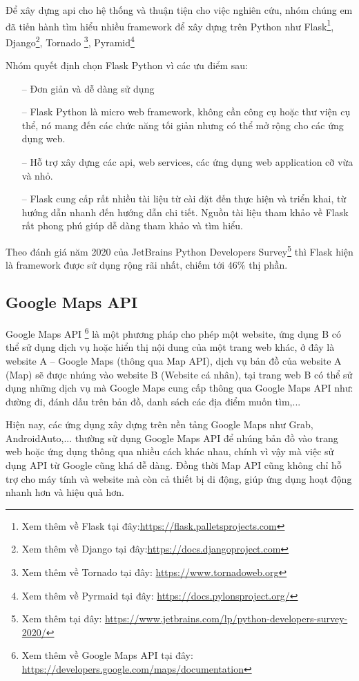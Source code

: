 Để xây dựng \ac{api} cho hệ thống và thuận tiện cho việc nghiên cứu, nhóm chúng em đã tiến hành tìm hiểu nhiều framework để xây dựng trên Python như Flask\footnote{Xem thêm về Flask tại đây:\url{https://flask.palletsprojects.com}}, Django\footnote{Xem thêm về Django tại đây:\url{https://docs.djangoproject.com}}, Tornado \footnote{Xem thêm về Tornado tại đây: \url{https://www.tornadoweb.org}}, Pyramid\footnote{Xem thêm về Pyrmaid tại đây: \url{https://docs.pylonsproject.org/}}

Nhóm quyết định chọn Flask Python vì các ưu điểm sau:
\begin{itemize}
    \item[--] Đơn giản và dễ dàng sử dụng
    \item[--] Flask Python là micro web framework, không cần công cụ hoặc thư viện cụ thể, nó mang đến các chức năng tối giản nhưng có thể mở rộng cho các ứng dụng web.
    \item[--] Hỗ trợ xây dựng các \ac{api}, web services, các ứng dụng web application cỡ vừa và nhỏ.
    \item[--] Flask cung cấp rất nhiều tài liệu từ cài đặt đến thực hiện và triển khai, từ hướng dẫn nhanh đến hướng dẫn chi tiết. Nguồn tài liệu tham khảo về Flask rất phong phú giúp dễ dàng tham khảo và tìm hiểu.
\end{itemize}

Theo đánh giá năm 2020 của JetBrains Python Developers Survey\footnote{Xem thêm tại đây: \url{https://www.jetbrains.com/lp/python-developers-survey-2020/}} thì Flask hiện là framework được sử dụng rộng rãi nhất, chiếm tới 46\% thị phần.
\subsection{Google Maps API}
Google Maps API \footnote{Xem thêm về Google Maps API tại đây: \url{https://developers.google.com/maps/documentation}} là một phương pháp cho phép một website, ứng dụng B có thể sử dụng dịch vụ hoặc hiển thị nội dung của một trang web khác, ở đây là website A – Google Maps (thông qua Map API), dịch vụ bản đồ của website A (Map) sẽ được nhúng vào website B (Website cá nhân), tại trang web B có thể sử dụng những dịch vụ mà Google Maps cung cấp thông qua Google Maps API như: đường đi, đánh dấu trên bản đồ, danh sách các địa điểm muốn tìm,...

Hiện nay, các ứng dụng xây dựng trên nền tảng Google Maps như Grab, AndroidAuto,... thường sử dụng Google Maps API để nhúng bản đồ vào trang web hoặc ứng dụng thông qua nhiều cách khác nhau, chính vì vậy mà việc sử dụng API từ Google cũng khá dễ dàng. Đồng thời Map API cũng không chỉ hỗ trợ cho máy tính và website mà còn cả thiết bị di động, giúp ứng dụng hoạt động nhanh hơn và hiệu quả hơn.

